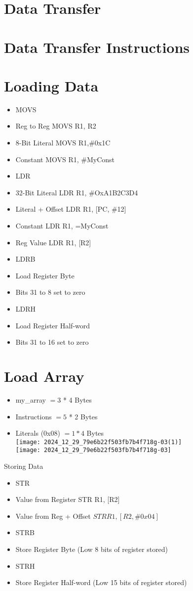 \section{Data Transfer}

\section*{Data Transfer Instructions}
\section*{Loading Data}
\begin{itemize}
  \item MOVS
  \item Reg to Reg MOVS R1, R2
  \item 8-Bit Literal MOVS R1,\#0x1C
  \item Constant MOVS R1, \#MyConst
  \item LDR
  \item 32-Bit Literal LDR R1, \#OxA1B2C3D4
  \item Literal + Offset LDR R1, [PC, \#12]
  \item Constant LDR R1, =MyConst
  \item Reg Value LDR R1, [R2]
  \item LDRB
  \item Load Register Byte
  \item Bits 31 to 8 set to zero
  \item LDRH
  \item Load Register Half-word
  \item Bits 31 to 16 set to zero
\end{itemize}

\section*{Load Array}
\begin{itemize}
  \item my\_array $=3$ * 4 Bytes
  \item Instructions $=5$ * 2 Bytes
  \item Literals (0x08) $=1 * 4$ Bytes\\
\texttt{[image: 2024\_12\_29\_79e6b22f503fb7b4f718g-03(1)]}\\
\texttt{[image: 2024\_12\_29\_79e6b22f503fb7b4f718g-03]}
\end{itemize}

Storing Data

\begin{itemize}
  \item STR
  \item Value from Register STR R1, [R2]
  \item Value from Reg + Offset $S T R R 1,[R 2, \# 0 x 04]$
  \item STRB
  \item Store Register Byte (Low 8 bits of register stored)
  \item STRH
  \item Store Register Half-word (Low 15 bits of register stored)
\end{itemize}